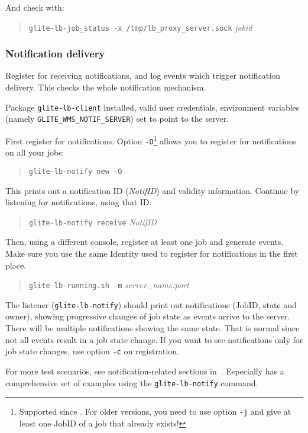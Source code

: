And check with:
\begin{quote}
\verb'glite-lb-job_status -x /tmp/lb_proxy_server.sock' \emph{jobid}
\end{quote}


\subsubsection{Notification delivery}

Register for receiving notifications, and log events which trigger
notification delivery. This checks the whole notification mechanism.

\req Package \texttt{glite-lb-client} installed, valid user credentials, environment variables (namely \texttt{GLITE\_WMS\_NOTIF\_SERVER}) set to point to the \LB server.

\how
First register for notifications. Option \texttt{-O}\footnote{Supported since . For older versions, you need to use option \texttt{-j} and give at least one JobID of a job that already exists!} allows you to register for notifications on all your jobs:
\begin{quote}
\texttt{glite-lb-notify new -O}
\end{quote}
This prints out a notification ID (\emph{NotifID}) and validity information. Continue by listening for notifications, using that ID:
\begin{quote}
\texttt{glite-lb-notify receive} \emph{NotifID}
\end{quote}
Then, using a different console, register at least one job and generate events. Make sure you use the same Identity used to register for notifications in the first place.
\begin{quote}
\texttt{glite-lb-running.sh -m} \emph{server\_name:port}
\end{quote}

\result
The listener (\texttt{glite-lb-notify}) should print out notifications (JobID, state and owner), showing progressive changes of job state as events arrive to the server. There will be multiple notifications showing the same state. That is normal since not all events result in a job state change. If you want to see notifications only for job state changes, use option \texttt{-c} on registration.

For more test scenarios, see notification-related sections in~\cite{lbug,lbtp}. Especially \cite{lbug} has a comprehensive set of examples using the \texttt{glite-lb-notify} command.
